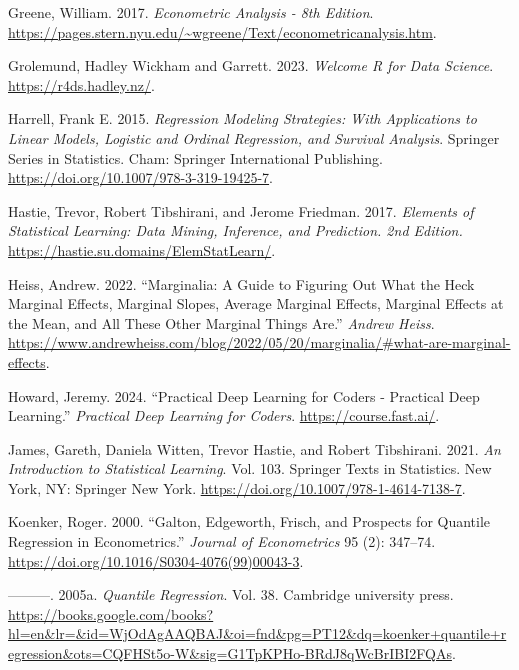 \documentclass[
  letterpaper,
]{krantz}
\newlength{\cslhangindent}
\newenvironment{CSLReferences}[2] %
 {\begin{list}{}{%
  \setlength{\itemindent}{0pt}
  \setlength{\leftmargin}{0pt}
  \setlength{\parsep}{0pt}
  \ifodd #1
   \setlength{\leftmargin}{\cslhangindent}
   \setlength{\itemindent}{-1\cslhangindent}
  \fi
  \setlength{\itemsep}{#2\baselineskip}}}
 {\end{list}}
\begin{document}
\begin{CSLReferences}{1}{0}
Greene, William. 2017. \emph{Econometric {Analysis} - 8th {Edition}}.
\url{https://pages.stern.nyu.edu/~wgreene/Text/econometricanalysis.htm}.

Grolemund, Hadley Wickham and Garrett. 2023. \emph{Welcome {\textbar}
{R} for {Data} {Science}}. \url{https://r4ds.hadley.nz/}.

Harrell, Frank E. 2015. \emph{Regression {Modeling} {Strategies}: {With}
{Applications} to {Linear} {Models}, {Logistic} and {Ordinal}
{Regression}, and {Survival} {Analysis}}. Springer {Series} in
{Statistics}. Cham: Springer International Publishing.
\url{https://doi.org/10.1007/978-3-319-19425-7}.

Hastie, Trevor, Robert Tibshirani, and Jerome Friedman. 2017.
\emph{Elements of {Statistical} {Learning}: Data Mining, Inference, and
Prediction. 2nd {Edition}.}
\url{https://hastie.su.domains/ElemStatLearn/}.

Heiss, Andrew. 2022. {``Marginalia: {A} Guide to Figuring Out What the
Heck Marginal Effects, Marginal Slopes, Average Marginal Effects,
Marginal Effects at the Mean, and All These Other Marginal Things
Are.''} \emph{Andrew Heiss}.
\url{https://www.andrewheiss.com/blog/2022/05/20/marginalia/\#what-are-marginal-effects}.

Howard, Jeremy. 2024. {``Practical {Deep} {Learning} for {Coders} -
{Practical} {Deep} {Learning}.''} \emph{Practical Deep Learning for
Coders}. \url{https://course.fast.ai/}.

James, Gareth, Daniela Witten, Trevor Hastie, and Robert Tibshirani.
2021. \emph{An {Introduction} to {Statistical} {Learning}}. Vol. 103.
Springer {Texts} in {Statistics}. New York, NY: Springer New York.
\url{https://doi.org/10.1007/978-1-4614-7138-7}.

Koenker, Roger. 2000. {``Galton, {Edgeworth}, {Frisch}, and Prospects
for Quantile Regression in Econometrics.''} \emph{Journal of
Econometrics} 95 (2): 347--74.
\url{https://doi.org/10.1016/S0304-4076(99)00043-3}.

---------. 2005a. \emph{Quantile Regression}. Vol. 38. Cambridge
university press.
\url{https://books.google.com/books?hl=en&lr=&id=WjOdAgAAQBAJ&oi=fnd&pg=PT12&dq=koenker+quantile+regression&ots=CQFHSt5o-W&sig=G1TpKPHo-BRdJ8qWcBrIBI2FQAs}.


\end{CSLReferences}
\end{document}
